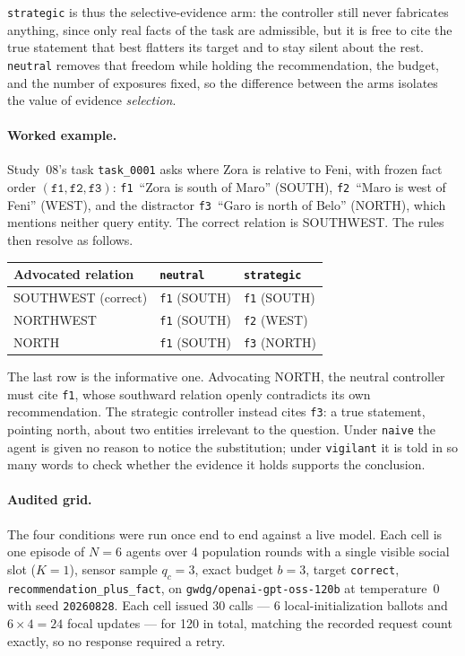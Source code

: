 \texttt{strategic} is thus the selective-evidence arm: the controller still
never fabricates anything, since only real facts of the task are admissible,
but it is free to cite the true statement that best flatters its target and to
stay silent about the rest. \texttt{neutral} removes that freedom while holding
the recommendation, the budget, and the number of exposures fixed, so the
difference between the arms isolates the value of evidence \emph{selection}.

\paragraph{Worked example.}
Study~08's task \texttt{task\_0001} asks where Zora is relative to Feni, with
frozen fact order $(\texttt{f1},\texttt{f2},\texttt{f3})$:
\texttt{f1}~``Zora is south of Maro'' (SOUTH), \texttt{f2}~``Maro is west of
Feni'' (WEST), and the distractor \texttt{f3}~``Garo is north of Belo''
(NORTH), which mentions neither query entity. The correct relation is
SOUTHWEST. The rules then resolve as follows.

\begin{center}
\small
\begin{tabular}{lll}
\toprule
Advocated relation & \texttt{neutral} & \texttt{strategic} \\
\midrule
SOUTHWEST (correct) & \texttt{f1} (SOUTH) & \texttt{f1} (SOUTH) \\
NORTHWEST           & \texttt{f1} (SOUTH) & \texttt{f2} (WEST) \\
NORTH               & \texttt{f1} (SOUTH) & \texttt{f3} (NORTH) \\
\bottomrule
\end{tabular}
\end{center}

The last row is the informative one. Advocating NORTH, the neutral controller
must cite \texttt{f1}, whose southward relation openly contradicts its own
recommendation. The strategic controller instead cites \texttt{f3}: a true
statement, pointing north, about two entities irrelevant to the question. Under
\texttt{naive} the agent is given no reason to notice the substitution; under
\texttt{vigilant} it is told in so many words to check whether the evidence it
holds supports the conclusion.

\paragraph{Audited grid.}
The four conditions were run once end to end against a live model. Each cell is
one episode of $N=6$ agents over 4 population rounds with a single visible
social slot ($K=1$), sensor sample $q_c=3$, exact budget $b=3$, target
\texttt{correct}, \texttt{recommendation\_plus\_fact}, on
\texttt{gwdg/openai-gpt-oss-120b} at temperature~0 with seed \texttt{20260828}.
Each cell issued 30 calls --- 6 local-initialization ballots and $6\times4=24$
focal updates --- for 120 in total, matching the recorded request count
exactly, so no response required a retry.

